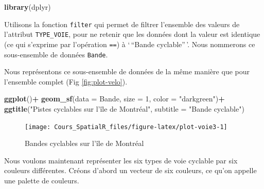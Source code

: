 \documentclass[
  12pt,
]{krantz}
\newenvironment{Shaded}{\begin{snugshade}}{\end{snugshade}}
\newcommand{\DataTypeTok}[1]{\textcolor[rgb]{0.13,0.29,0.53}{#1}}
\newcommand{\DecValTok}[1]{\textcolor[rgb]{0.00,0.00,0.81}{#1}}
\newcommand{\KeywordTok}[1]{\textcolor[rgb]{0.13,0.29,0.53}{\textbf{#1}}}
\newcommand{\NormalTok}[1]{#1}
\newcommand{\OperatorTok}[1]{\textcolor[rgb]{0.81,0.36,0.00}{\textbf{#1}}}
\newcommand{\StringTok}[1]{\textcolor[rgb]{0.31,0.60,0.02}{#1}}
\begin{document}
\begin{Shaded}
\begin{Highlighting}[]
\KeywordTok{library}\NormalTok{(dplyr)}
\end{Highlighting}
\end{Shaded}

Utilisons la fonction \texttt{filter} qui permet de filtrer l'ensemble des valeurs de l'attribut \texttt{TYPE\_VOIE}, pour ne retenir que les données dont la valeur est identique (ce qui s'exprime par l'opération \texttt{==}) à `\,``Bande cyclable''\,'. Nous nommerons ce sous-ensemble de données \texttt{Bande}.

\begin{Shaded}
\end{Shaded}

Nous représentons ce sous-ensemble de données de la même manière que pour l'ensemble complet (Fig \ref{fig:plot-velo}).

\begin{Shaded}
\begin{Highlighting}[]
\KeywordTok{ggplot}\NormalTok{()}\OperatorTok{+}
\StringTok{  }\KeywordTok{geom_sf}\NormalTok{(}\DataTypeTok{data =}\NormalTok{ Bande,  }\DataTypeTok{size =} \DecValTok{1}\NormalTok{, }\DataTypeTok{color =} \StringTok{"darkgreen"}\NormalTok{)}\OperatorTok{+}
\StringTok{  }\KeywordTok{ggtitle}\NormalTok{(}\StringTok{"Pistes cyclables sur l'île de Montréal"}\NormalTok{, }\DataTypeTok{subtitle =} \StringTok{"Bande cyclable"}\NormalTok{)}
\end{Highlighting}
\end{Shaded}

\begin{figure}

{\centering \texttt{[image: Cours\_SpatialR\_files/figure-latex/plot-voie3-1]} 

}

\caption{Bandes cyclables sur l'île de Montréal}\label{fig:plot-voie3}
\end{figure}

Nous voulons maintenant représenter les six types de voie cyclable par six couleurs différentes. Créons d'abord un vecteur de six couleurs, ce qu'on appelle une palette de couleurs.
\end{document}
